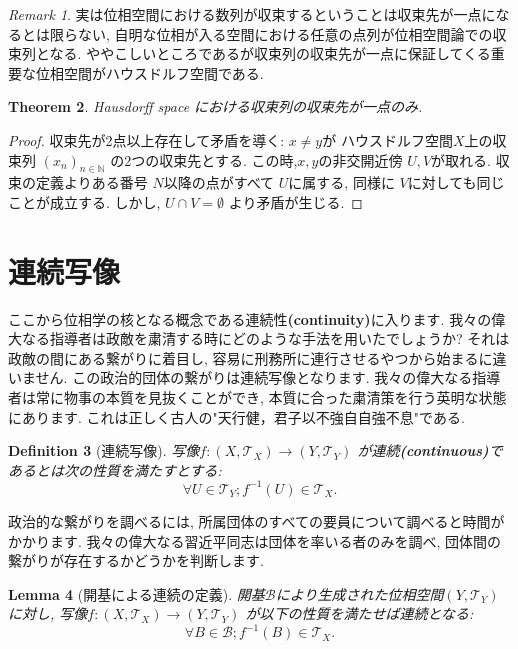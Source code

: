 \documentclass[dvipdfmx]{jbook}
\newtheorem{theorem}{Theorem}[section]
\newtheorem{lemma}[theorem]{Lemma}
\newtheorem{definition}[theorem]{Definition}
\theoremstyle{remark}
\newtheorem{remark}[theorem]{Remark}
\theoremstyle{plain}
\begin{document}
\begin{remark}
実は位相空間における数列が収束するということは収束先が一点になるとは限らない, 自明な位相が入る空間における任意の点列が位相空間論での収束列となる. 
ややこしいところであるが収束列の収束先が一点に保証してくる重要な位相空間がハウスドルフ空間である.	
\end{remark}

\begin{theorem}
Hausdorff space における収束列の収束先が一点のみ.
\end{theorem}

\begin{proof}
	収束先が2点以上存在して矛盾を導く: $x \neq y$が ハウスドルフ空間$X$上の収束列 $\left( x_n \right) _{n \in \mathbb{N} }$ の2つの収束先とする. 
	この時,$x,y$の非交開近傍 $U,V$が取れる. 
	収束の定義よりある番号 $N$以降の点がすべて $U$に属する, 同様に $V$に対しても同じことが成立する. 
	しかし,  $U\cap V = \emptyset$ より矛盾が生じる.
\end{proof}

\section{連続写像}%
\label{sec:連続写像}
ここから位相学の核となる概念である連続性\textbf{(continuity)}に入ります.
我々の偉大なる指導者は政敵を粛清する時にどのような手法を用いたでしょうか? 
それは政敵の間にある繋がりに着目し, 容易に刑務所に連行させるやつから始まるに違いません. この政治的団体の繋がりは連続写像となります. 
我々の偉大なる指導者は常に物事の本質を見抜くことができ, 本質に合った粛清策を行う英明な状態にあります. これは正しく古人の"天行健，君子以不強自自強不息"である.
\begin{definition}[連続写像]
	写像$f: \left( X , \mathcal{T}_X \right) \to \left( Y, \mathcal{T}_Y \right) $ が連続\textbf{(continuous)}であるとは次の性質を満たすとする:
	\[
	\forall U \in \mathcal{T}_Y; f^{-1}\left( U \right) \in \mathcal{T}_X 
	.\] 
\end{definition}

政治的な繋がりを調べるには, 所属団体のすべての要員について調べると時間がかかります. 我々の偉大なる習近平同志は団体を率いる者のみを調べ, 団体間の繋がりが存在するかどうかを判断します.

\begin{lemma}[開基による連続の定義]
開基$\mathcal{B}$により生成された位相空間$\left( Y, \mathcal{T}_Y \right) $に対し,
写像$f: \left( X , \mathcal{T}_X \right) \to \left( Y, \mathcal{T}_Y \right) $ が以下の性質を満たせば連続となる:
\[
\forall B \in \mathcal{B}; f^{-1}\left( B \right) \in \mathcal{T}_X
.\] 

\end{lemma}
\end{document}
